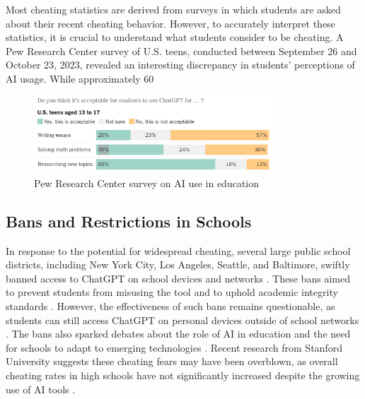 \documentclass{article}
\begin{document}
Most cheating statistics are derived from surveys in which students are asked about their recent cheating behavior. However, to accurately interpret these statistics, it is crucial to understand what students consider to be cheating. A Pew Research Center survey of U.S. teens, conducted between September 26 and October 23, 2023, revealed an interesting discrepancy in students' perceptions of AI usage. While approximately 60%

\begin{figure}
    \centering
    \includegraphics[width=0.8\textwidth]{images/chatgpt_acceptable_usecases.png}
    \caption{Pew Research Center survey on AI use in education}
\end{figure}

\subsection{Bans and Restrictions in Schools}
In response to the potential for widespread cheating, several large public school districts, including New York City, Los Angeles, Seattle, and Baltimore, swiftly banned access to ChatGPT on school devices and networks \cite{https://oai.missouri.edu/chatgpt-artificial-intelligence-and-academic-integrity/} \cite{https://www.reddit.com/r/changemyview/comments/123m3xr/cmv_using_chatgpt_for_academic_purposes_is_not_an/}. These bans aimed to prevent students from misusing the tool and to uphold academic integrity standards \cite{https://oai.missouri.edu/chatgpt-artificial-intelligence-and-academic-integrity/}.
However, the effectiveness of such bans remains questionable, as students can still access ChatGPT on personal devices outside of school networks \cite{https://www.reddit.com/r/changemyview/comments/123m3xr/cmv_using_chatgpt_for_academic_purposes_is_not_an/}. The bans also sparked debates about the role of AI in education and the need for schools to adapt to emerging technologies \cite{https://oai.missouri.edu/chatgpt-artificial-intelligence-and-academic-integrity/} \cite{https://www.reddit.com/r/changemyview/comments/123m3xr/cmv_using_chatgpt_for_academic_purposes_is_not_an/}.
Recent research from Stanford University suggests these cheating fears may have been overblown, as overall cheating rates in high schools have not significantly increased despite the growing use of AI tools \cite{https://www.nytimes.com/2023/12/13/technology/chatbot-cheating-schools-students.html}.
\end{document}

